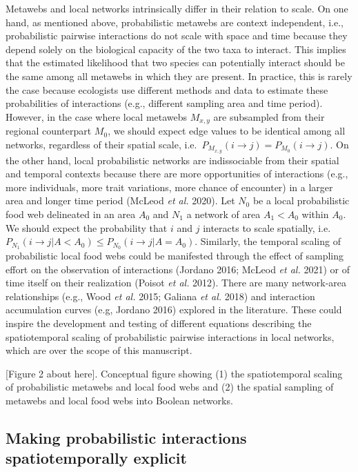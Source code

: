 \documentclass[10pt,oneside]{article}
\begin{document}
Metawebs and local networks intrinsically differ in their relation to
scale. On one hand, as mentioned above, probabilistic metawebs are
context independent, i.e., probabilistic pairwise interactions do not
scale with space and time because they depend solely on the biological
capacity of the two taxa to interact. This implies that the estimated
likelihood that two species can potentially interact should be the same
among all metawebs in which they are present. In practice, this is
rarely the case because ecologists use different methods and data to
estimate these probabilities of interactions (e.g., different sampling
area and time period). However, in the case where local metawebs
\(M_{x,y}\) are subsampled from their regional counterpart \(M_0\), we
should expect edge values to be identical among all networks, regardless
of their spatial scale,
i.e.~\(P_{M_{x,y}}(i \rightarrow j) = P_{M_0}(i \rightarrow j)\). On the
other hand, local probabilistic networks are indissociable from their
spatial and temporal contexts because there are more opportunities of
interactions (e.g., more individuals, more trait variations, more chance
of encounter) in a larger area and longer time period (McLeod \emph{et
al.} 2020). Let \(N_0\) be a local probabilistic food web delineated in
an area \(A_0\) and \(N_1\) a network of area \(A_1 < A_0\) within
\(A_0\). We should expect the probability that \(i\) and \(j\) interacts
to scale spatially,
i.e.~\(P_{N_1}(i \rightarrow j | A < A_0) \le P_{N_0}(i \rightarrow j | A = A_0)\).
Similarly, the temporal scaling of probabilistic local food webs could
be manifested through the effect of sampling effort on the observation
of interactions (Jordano 2016; McLeod \emph{et al.} 2021) or of time
itself on their realization (Poisot \emph{et al.} 2012). There are many
network-area relationships (e.g., Wood \emph{et al.} 2015; Galiana
\emph{et al.} 2018) and interaction accumulation curves (e.g, Jordano
2016) explored in the literature. These could inspire the development
and testing of different equations describing the spatiotemporal scaling
of probabilistic pairwise interactions in local networks, which are over
the scope of this manuscript.

{[}Figure 2 about here{]}. Conceptual figure showing (1) the
spatiotemporal scaling of probabilistic metawebs and local food webs and
(2) the spatial sampling of metawebs and local food webs into Boolean
networks.

\hypertarget{making-probabilistic-interactions-spatiotemporally-explicit}{%
\subsection{Making probabilistic interactions spatiotemporally
explicit}\label{making-probabilistic-interactions-spatiotemporally-explicit}}
\end{document}
